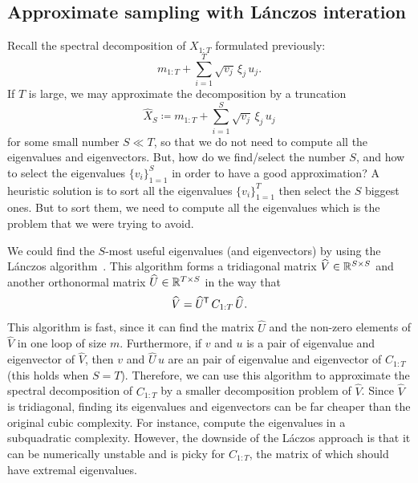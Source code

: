 \documentclass[]{article}
\begin{document}
\subsection{Approximate sampling with L\'{a}nczos interation}
\label{sec:lanczos}
Recall the spectral decomposition of $X_{1:T}$ formulated previously:
%
\begin{equation*}
	m_{1:T} + \sum^T_{i=1} \sqrt{v_j} \, \xi_j \, u_j.
\end{equation*}
%
If $T$ is large, we may approximate the decomposition by a truncation
%
\begin{equation*}
	\widehat{X}_S \coloneqq m_{1:T} + \sum^S_{i=1} \sqrt{v_j} \, \xi_j \, u_j
\end{equation*}
%
for some small number $S \ll T$, so that we do not need to compute all the eigenvalues and eigenvectors. But, how do we find/select the number $S$, and how to select the eigenvalues $\lbrace v_i \rbrace_{1=1}^S$ in order to have a good approximation? A heuristic solution is to sort all the eigenvalues $\lbrace v_i \rbrace_{1=1}^T$ then select the $S$ biggest ones. But to sort them, we need to compute all the eigenvalues which is the problem that we were trying to avoid. 

We could find the $S$-most useful eigenvalues (and eigenvectors) by using the L\'{a}nczos algorithm~\citep[see,][Ch. 10]{Golub2013}. This algorithm forms a tridiagonal matrix $\widehat{V} \in \mathbb{R}^{S \times S}$ and another orthonormal matrix $\widehat{U}\in\mathbb{R}^{T \times S}$ in the way that
%
\begin{equation*}
	\widehat{V} = \widehat{U}^{\mkern-1.5mu\mathsf{T}} \, C_{1:T} \, \widehat{U}.
\end{equation*}
%
This algorithm is fast, since it can find the matrix $\widehat{U}$ and the non-zero elements of $\widehat{V}$ in one loop of size $m$. Furthermore, if $v$ and $u$ is a pair of eigenvalue and eigenvector of $\widehat{V}$, then $v$ and $\widehat{U} \, u$ are an pair of eigenvalue and eigenvector of $C_{1:T}$ (this holds when $S=T$). Therefore, we can use this algorithm to approximate the spectral decomposition of $C_{1:T}$ by a smaller decomposition problem of $\widehat{V}$. Since $\widehat{V}$ is tridiagonal, finding its eigenvalues and eigenvectors can be far cheaper than the original cubic complexity. For instance, \citet{Coakley2013} compute the eigenvalues in a subquadratic complexity. However, the downside of the L\'{a}czos approach is that it can be numerically unstable and is picky for $C_{1:T}$, the matrix of which should have extremal eigenvalues.
\end{document}
